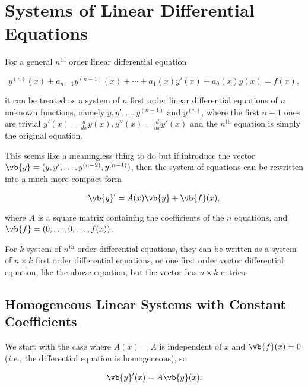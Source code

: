 \documentclass[english,a4paper,12pt]{report}
\begin{document}

\chapter{Systems of Linear Differential Equations}

For a general \(n^{\text{th}} \) order linear differential equation

\begin{equation}
    y^{(n)}(x) + a_{n-1}y^{(n-1)}(x) + \cdots + a_1 (x)y'(x) + a_0 (x)y(x) = f(x),   
\end{equation}

it can be treated as a system of \(n\) first order linear differential equations of \(n\) unknown functions, namely \(y,y',\ldots ,y^{(n-1)}  \text { and } y^{(n)} \), where the first \(n-1\) ones are trivial  \(y'(x) = \frac{d}{dx}y(x), y''(x) = \frac{d}{dx} y'(x)\) and the \(n^{\text{th}} \) equation is simply the original equation.

This seems like a meaningless thing to do but if introduce the vector \(\vb{y} = (y,y',\ldots ,y^{(n-2)}, y^{(n-1)})\), then the system of equations can be rewritten into a much more compact form

\begin{equation}
    \vb{y} ' = A (x)\vb{y} + \vb{f} (x), \label{inhomosys} 
\end{equation}

where \(A\) is a square matrix containing the coefficients of the \(n\) equations, and \(\vb{f} = (0,\ldots ,0,\ldots ,f(x))\).

For \(k\) system of \(n^{\text{th}} \) order differential equations, they can be written as a system of \(n \times k\) first order differential equations, or one first order vector differential equation, like the above equation, but the vector has \(n \times k\) entries.   

\section{Homogeneous Linear Systems with Constant Coefficients} \label{homosys} 

We start with the case where \(A(x) = A\) is independent of \(x\) and \(\vb{f} (x) = 0\) (\textit{i.e.,} the differential equation is homogeneous), so

\begin{equation}
    \vb{y}'(x) = A \vb{y}(x).  
\end{equation}
\end{document}
